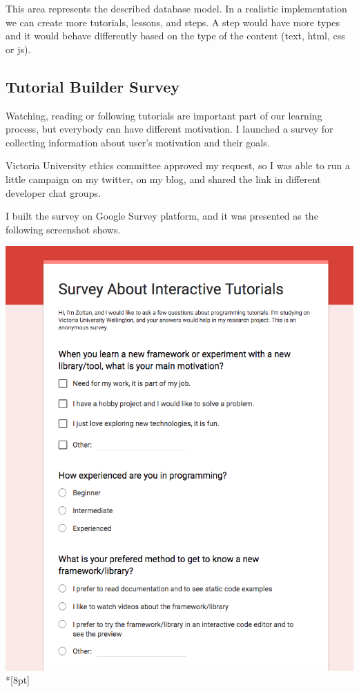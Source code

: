 \documentclass[12pt, a4paper, oneside, openright, medskipamount]{report}
\begin{document}
This area represents the described database model. In a realistic implementation we can create more tutorials, lessons, and steps. A step would have more types and it would behave differently based on the type of the content (text, html, css or js).

\newpage

\subsection{Tutorial Builder Survey}

Watching, reading or following tutorials are important part of our learning process, but everybody can have different motivation. I launched a survey for collecting information about user's motivation and their goals.

Victoria University ethics committee approved my request, so I was able to run a little campaign on my twitter, on my blog, and shared the link in different developer chat groups.

I built the survey on Google Survey platform, and it was presented as the following screenshot shows.

\includegraphics[width=1\textwidth]{assets/survey-screenshot.png}\\*[8pt]
\end{document}

